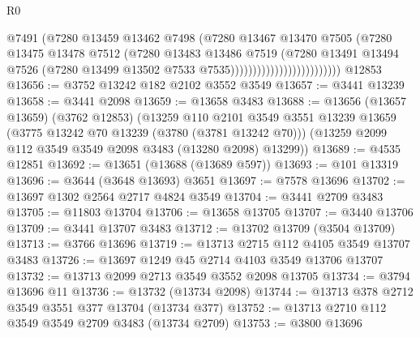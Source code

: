\begin{lexlean}{R0}
\begin{coremodule}
                                          @7491
                                          (@7280
                                            @13459
                                            @13462
                                            @7498
                                            (@7280
                                              @13467
                                              @13470
                                              @7505
                                              (@7280
                                                @13475
                                                @13478
                                                @7512
                                                (@7280
                                                  @13483
                                                  @13486
                                                  @7519
                                                  (@7280
                                                    @13491
                                                    @13494
                                                    @7526
                                                    (@7280
                                                      @13499
                                                      @13502
                                                      @7533
                                                      @7535)))))))))))))))))))))))))
    @12853
@13656 := @3752 @13242 @182 @2102 @3552 @3549
@13657 := @3441 @13239
@13658 := @3441 @2098
@13659 := @13658 @3483
@13688 := @13656
    (@13657 @13659)
    (@3762 @12853)
    (@13259
      @110
      @2101
      @3549
      @3551
      @13239
      @13659
      (@3775 @13242 @70 @13239 (@3780 (@3781 @13242 @70)))
      (@13259 @2099 @112 @3549 @3549 @2098 @3483 (@13280 @2098) @13299))
@13689 := @4535 @12851
@13692 := @13651 (@13688 (@13689 @597))
@13693 := @101 @13319
@13696 := @3644 (@3648 @13693) @3651
@13697 := @7578 @13696
@13702 := @13697 @1302 @2564 @2717 @4824 @3549
@13704 := @3441 @2709 @3483
@13705 := @11803 @13704
@13706 := @13658 @13705
@13707 := @3440 @13706
@13709 := @3441 @13707 @3483
@13712 := @13702 @13709 (@3504 @13709)
@13713 := @3766 @13696
@13719 := @13713 @2715 @112 @4105 @3549 @13707 @3483
@13726 := @13697 @1249 @45 @2714 @4103 @3549 @13706 @13707
@13732 := @13713 @2099 @2713 @3549 @3552 @2098 @13705
@13734 := @3794 @13696 @11
@13736 := @13732 (@13734 @2098)
@13744 := @13713 @378 @2712 @3549 @3551 @377 @13704 (@13734 @377)
@13752 := @13713 @2710 @112 @3549 @3549 @2709 @3483 (@13734 @2709)
@13753 := @3800 @13696

\end{coremodule}
\end{lexlean}
